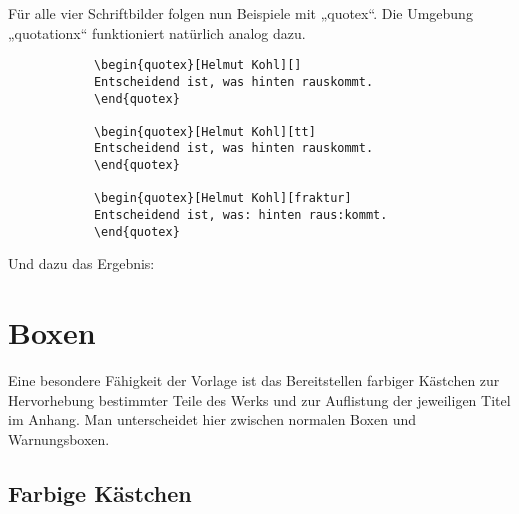 			Für alle vier Schriftbilder folgen nun Beispiele mit „quotex“. Die Umgebung „quotationx“ funktioniert natürlich analog dazu.

			\begin{verbatim}
			\begin{quotex}[Helmut Kohl][]
			Entscheidend ist, was hinten rauskommt.
			\end{quotex}

			\begin{quotex}[Helmut Kohl][tt]
			Entscheidend ist, was hinten rauskommt.
			\end{quotex}

			\begin{quotex}[Helmut Kohl][fraktur]
			Entscheidend ist, was: hinten raus:kommt.
			\end{quotex}
			\end{verbatim}\newline

			Und dazu das Ergebnis: \newline

			\newline

		\section{Boxen}

			Eine besondere Fähigkeit der Vorlage ist das Bereitstellen farbiger Kästchen zur Hervorhebung bestimmter Teile des Werks und zur Auflistung der jeweiligen Titel im Anhang. Man unterscheidet hier zwischen normalen Boxen und Warnungsboxen.

			\subsection{Farbige Kästchen}


